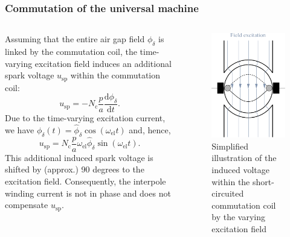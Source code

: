 \begin{frame}
	\frametitle{Commutation of the universal machine}
	\begin{columns}
		\begin{column}{0.65\textwidth}
		Assuming that the entire air gap field $\phi_\delta$ is linked by the commutation coil, the time-varying excitation field induces an additional spark voltage $u_\mathrm{sp}$ within the commutation coil:
		\begin{equation}
			u_\mathrm{sp} = -N_\mathrm{c} \frac{p}{a} \frac{\mathrm{d}\phi_\delta}{\mathrm{d}t}.
		\end{equation}
		Due to the time-varying excitation current, we have $\phi_\delta(t) = \hat{\phi}_\delta\cos(\omega_\mathrm{el} t)$ and, hence,
		\begin{equation}
			u_\mathrm{sp} = N_\mathrm{c} \frac{p}{a} \omega_\mathrm{el} \hat{\phi}_\delta \sin(\omega_\mathrm{el} t).
			\label{eq:Induced_spark_voltage}
		\end{equation}
		This additional induced spark voltage is shifted by (approx.) 90 degrees to the excitation field. Consequently, the interpole winding current is not in phase and does not compensate $u_\mathrm{sp}$.
\end{column}
\hfill
\begin{column}{0.35\textwidth}
	\begin{figure}
		\centering
		\includegraphics[scale=1]{fig/lec03/Commutation_universal_machine.pdf}
		\caption{Simplified illustration of the induced voltage within the short-circuited commutation coil by the varying excitation field}
		\label{fig:Commutation_universal_machine}
\end{figure}
\end{column}
\end{columns}
\end{frame}


